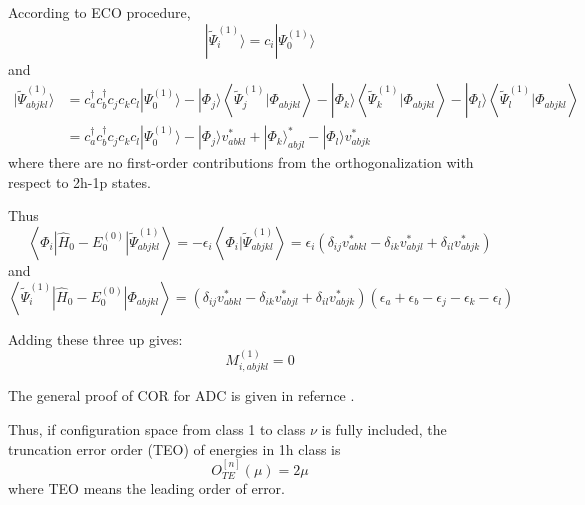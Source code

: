 \documentclass[bachelor, english]{ustcthesis}
\begin{document}
According to ECO procedure,
\begin{equation}
	| \tilde{\Psi}_{i}^{(1)} \rangle=c_{i} | \Psi_{0}^{(1)} \rangle
\end{equation}
and
\begin{equation}
	\begin{aligned} | \tilde{\Psi}_{a b j k l}^{(1)} \rangle &=c_{a}^{\dagger} c_{b}^{\dagger} c_{j} c_{k} c_{l} | \Psi_{0}^{(1)} \rangle-| \Phi_{j} \rangle\left\langle\tilde{\Psi}_{j}^{(1)} | \Phi_{a b j k l}\right\rangle-| \Phi_{k} \rangle\left\langle\tilde{\Psi}_{k}^{(1)} | \Phi_{a b j k l}\right\rangle-| \Phi_{l} \rangle\left\langle\tilde{\Psi}_{l}^{(1)} | \Phi_{a b j k l}\right\rangle \\ &= c_{a}^{\dagger} c_{b}^{\dagger} c_{j} c_{k} c_{l} | \Psi_{0}^{(1)} \rangle-| \Phi_{j} \rangle v_{a b k l}^{*}+| \Phi_{k} \rangle_{a b j l}^{*}-| \Phi_{l} \rangle v_{a b j k}^{*} \end{aligned}
\end{equation}
where there are no first-order contributions from the orthogonalization with
respect to 2h-1p states.

Thus
\begin{equation}
	\left\langle\Phi_{i}\left|\hat{H}_{0}-E_{0}^{(0)}\right| \tilde{\Psi}_{a b j k l}^{(1)}\right\rangle=-\epsilon_{i}\left\langle\Phi_{i} | \tilde{\Psi}_{a b j k l}^{(1)}\right\rangle=\epsilon_{i}\left(\delta_{i j} v_{a b k l}^{*}-\delta_{i k} v_{a b j l}^{*}+\delta_{i l} v_{a b j k}^{*}\right)
\end{equation}
and
\begin{equation}
	\left\langle\tilde{\Psi}_{i}^{(1)}\left|\hat{H}_{0}-E_{0}^{(0)}\right| \Phi_{a b j k l}\right\rangle=\left(\delta_{i j} v_{a b k l}^{*}-\delta_{i k} v_{a b j l}^{*}+\delta_{i l} v_{a b j k}^{*}\right)\left(\epsilon_{a}+\epsilon_{b}-\epsilon_{j}-\epsilon_{k}-\epsilon_{l}\right)
\end{equation}

Adding these three up gives:
\begin{equation}
	M_{i, a b j k l}^{(1)}=0
\end{equation}

The general proof of COR for ADC is given in refernce \cite{main}.

Thus, if configuration space from class 1 to class $\nu$ is fully included, the truncation error order (TEO) of energies in 1h class is
\begin{equation}
	O_{T E}^{[n]}(\mu)=2\mu
\end{equation}
where TEO means the leading order of error.
\end{document}

